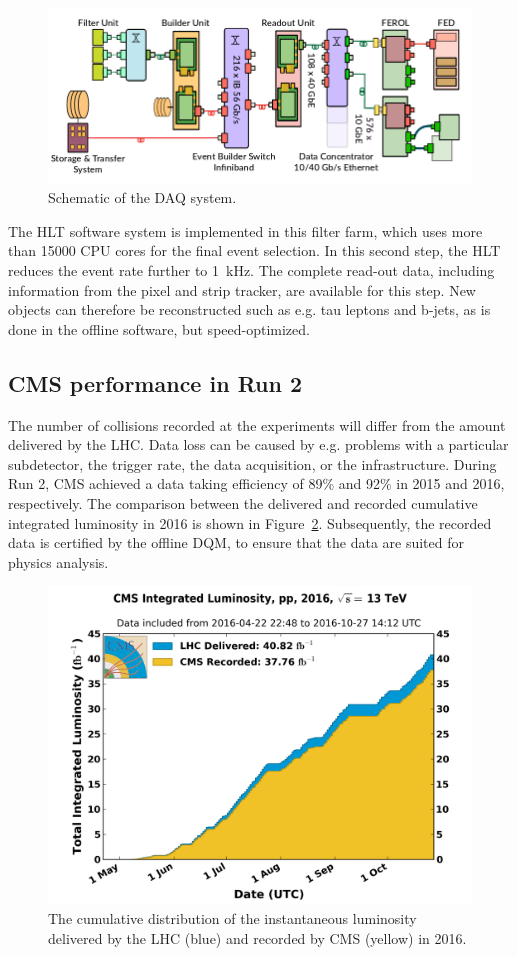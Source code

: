 \begin{figure}[ht]
  \centering
 \includegraphics[width=.9\textwidth]{DAQ}
 \caption{Schematic of the \protect\acf{DAQ} system.~\cite{Andre:2252634}}
 \label{fig:DAQ}
\end{figure}

The \ac{HLT} software system is implemented in this filter farm, which uses more than 15000 CPU cores for the final event selection. In this second step, the \ac{HLT} reduces the event rate further to \SI{1}{kHz}. The complete read-out data, including information from the pixel and strip tracker, are available for this step. New objects can therefore be reconstructed such as e.g. tau leptons and b-jets, as is done in the offline software, but speed-optimized.%

\subsection{CMS performance in Run 2}

The number of collisions recorded at the experiments will differ from the amount delivered by the \ac{LHC}. Data loss can be caused by e.g. problems with a particular subdetector, the trigger rate, the data acquisition, or the infrastructure. During Run 2, CMS achieved a data taking efficiency of 89\% and 92\% in 2015 and 2016, respectively. The comparison between the delivered and recorded cumulative integrated luminosity in 2016 is shown in Figure~\ref{fig:CMSlumi}. Subsequently, the recorded data is certified by the offline \ac{DQM}, to ensure that the data are suited for physics analysis. 

\begin{figure}[ht]
  \centering
 \includegraphics[width=.75\textwidth]{CMS_recorded_lumi}
 \caption{The cumulative distribution of the instantaneous luminosity delivered by the \ac{LHC} (blue) and recorded by \ac{CMS} (yellow) in 2016.}
 \label{fig:CMSlumi}
\end{figure}

